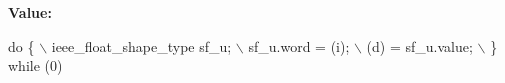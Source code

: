 {\bfseries Value\-:}
\begin{DoxyCode}
\textcolor{keywordflow}{do} \{                                                            \(\backslash\)
      ieee\_float\_shape\_type sf\_u;                                   \(\backslash\)
      sf\_u.word = (i);                                              \(\backslash\)
      (d) = sf\_u.value;                                             \(\backslash\)
    \} \textcolor{keywordflow}{while} (0)
\end{DoxyCode}
